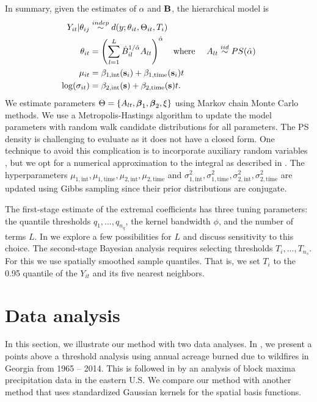 \documentclass[11pt]{article}
\begin{document}
In summary, given the estimates of $\alpha$ and $\mbox{\bf B}$, the hierarchical model is
\begin{align} \label{ebeq:bayesmodel}
  Y_{it} |\theta_{ij} &\stackrel{indep}{\sim} d(y;\theta_{it},\Theta_{it}, T_i) \\
  \theta_{it} &= \left(\sum_{l=1}^L{\hat B}_{il}^{1/\hat{\alpha}}A_{lt}\right)^{\hat{\alpha}}
  \text{\ \ \ where \ \ \ }
  A_{lt} \stackrel{iid}{\sim} PS(\hat{\alpha})\nonumber\\
  \mu_{it} &= \beta_{1, \text{int}}(\mbox{\bf s}_i) + \beta_{1, \text{time}}(\mbox{\bf s}_i) t \nonumber \\
  \log(\sigma_{it}) &= \beta_{2, \text{int}}(\mbox{\bf s}) + \beta_{2, \text{time}}(\mbox{\bf s}) t. \nonumber
\end{align}
We estimate parameters $\Theta = \left\{A_{lt}, \mbox{\boldmath $\beta$}_1, \mbox{\boldmath $\beta$}_2, \xi \right\}$ using Markov chain Monte Carlo methods.
We use a Metropolis-Hastings algorithm to update the model parameters with random walk candidate distributions for all parameters.
The PS density is challenging to evaluate as it does not have a closed form.
One technique to avoid this complication is to incorporate auxiliary random variables \citep{Stephenson2009}, but we opt for a numerical approximation to the integral as described in .
The hyperparameters $\mu_{1, \text{int}}, \mu_{1, \text{time}}, \mu_{2, \text{int}}, \mu_{2, \text{time}}$ and $\sigma^2_{1, \text{int}}, \sigma^2_{1, \text{time}}, \sigma^2_{2, \text{int}}, \sigma^2_{2, \text{time}}$ are updated using Gibbs sampling since their prior distributions are conjugate.

The first-stage estimate of the extremal coefficients has three tuning parameters: the quantile thresholds $q_1,...,q_{n_q}$, the kernel bandwidth $\phi$, and the number of terms $L$.
In  we explore a few possibilities for $L$ and discuss sensitivity to this choice.
The second-stage Bayesian analysis requires selecting thresholds $T_i,...,T_{n_s}$.  For this we use spatially smoothed sample quantiles.
That is, we set $T_i$ to the 0.95 quantile of the $Y_{it}$ and its five nearest neighbors.

\section{Data analysis}\label{ebs:analysis}
In this section, we illustrate our method with two data analyses.
In , we present a points above a threshold analysis using annual acreage burned due to wildfires in Georgia from 1965 -- 2014.
This is followed in  by an analysis of block maxima precipitation data in the eastern U.S.
We compare our method with another method that uses standardized Gaussian kernels for the spatial basis functions.
\end{document}
